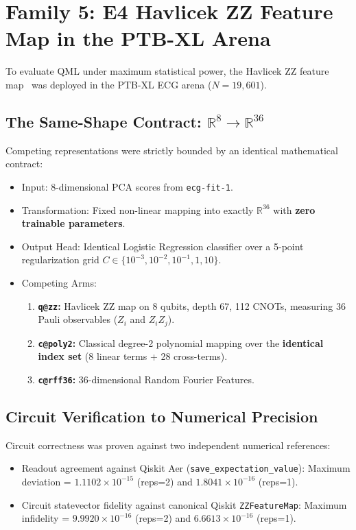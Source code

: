 \documentclass[11pt,a4paper]{report}
\begin{document}
\section{Family 5: E4 Havlicek ZZ Feature Map in the PTB-XL Arena}
To evaluate QML under maximum statistical power, the Havlicek ZZ feature map~\cite{havlicek2019supervised} was deployed in the PTB-XL ECG arena ($N=19,601$).

\subsection{The Same-Shape Contract: $\mathbb{R}^8 \to \mathbb{R}^{36}$}
Competing representations were strictly bounded by an identical mathematical contract:
\begin{itemize}
  \item Input: 8-dimensional PCA scores from \texttt{ecg-fit-1}.
  \item Transformation: Fixed non-linear mapping into exactly $\mathbb{R}^{36}$ with \textbf{zero trainable parameters}.
  \item Output Head: Identical Logistic Regression classifier over a 5-point regularization grid $C \in \{10^{-3}, 10^{-2}, 10^{-1}, 1, 10\}$.
  \item Competing Arms:
    \begin{enumerate}
      \item \textbf{\texttt{q@zz}:} Havlicek ZZ map on 8 qubits, depth 67, 112 CNOTs, measuring 36 Pauli observables ($Z_i$ and $Z_i Z_j$).
      \item \textbf{\texttt{c@poly2}:} Classical degree-2 polynomial mapping over the \textbf{identical index set} (8 linear terms + 28 cross-terms).
      \item \textbf{\texttt{c@rff36}:} 36-dimensional Random Fourier Features.
    \end{enumerate}
\end{itemize}

\subsection{Circuit Verification to Numerical Precision}
Circuit correctness was proven against two independent numerical references:
\begin{itemize}
  \item Readout agreement against Qiskit Aer (\texttt{save\_expectation\_value}): Maximum deviation = \textbf{$1.1102 \times 10^{-15}$} (reps=2) and \textbf{$1.8041 \times 10^{-16}$} (reps=1).
  \item Circuit statevector fidelity against canonical Qiskit \texttt{ZZFeatureMap}: Maximum infidelity = \textbf{$9.9920 \times 10^{-16}$} (reps=2) and \textbf{$6.6613 \times 10^{-16}$} (reps=1).
\end{itemize}
\end{document}
